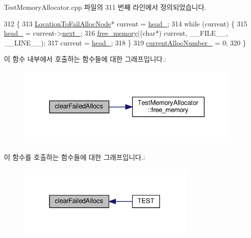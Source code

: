 Test\+Memory\+Allocator.\+cpp 파일의 311 번째 라인에서 정의되었습니다.


\begin{DoxyCode}
312 \{
313   \hyperlink{class_location_to_fail_alloc_node}{LocationToFailAllocNode}* current = \hyperlink{class_failable_memory_allocator_abca7541fbe80c2313fd718d9f1244c42}{head\_};
314   \textcolor{keywordflow}{while} (current) \{
315     \hyperlink{class_failable_memory_allocator_abca7541fbe80c2313fd718d9f1244c42}{head\_} = current->\hyperlink{class_location_to_fail_alloc_node_a1d488315b4672de363b3dd44df78f2e8}{next\_};
316     \hyperlink{class_test_memory_allocator_a529ac9813d3b0836ce0b964449942534}{free\_memory}((\textcolor{keywordtype}{char}*) current, \_\_FILE\_\_, \_\_LINE\_\_);
317     current = \hyperlink{class_failable_memory_allocator_abca7541fbe80c2313fd718d9f1244c42}{head\_};
318   \}
319   \hyperlink{class_failable_memory_allocator_ac565cda74c1659a4c2400f97a8a0872b}{currentAllocNumber\_} = 0;
320 \}
\end{DoxyCode}


이 함수 내부에서 호출하는 함수들에 대한 그래프입니다.\+:
\nopagebreak
\begin{figure}[H]
\begin{center}
\leavevmode
\includegraphics[width=317pt]{class_failable_memory_allocator_aa09a5d5a71e98690dc53499607a36e1c_cgraph}
\end{center}
\end{figure}




이 함수를 호출하는 함수들에 대한 그래프입니다.\+:
\nopagebreak
\begin{figure}[H]
\begin{center}
\leavevmode
\includegraphics[width=249pt]{class_failable_memory_allocator_aa09a5d5a71e98690dc53499607a36e1c_icgraph}
\end{center}
\end{figure}


